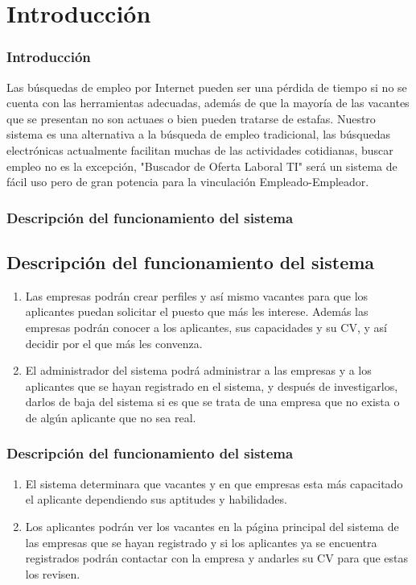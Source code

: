 \section{Introducción}
\frame
{
  \frametitle{Introducción} 
 Las búsquedas de empleo por Internet pueden ser una pérdida de tiempo si no se cuenta con las herramientas adecuadas, además de que la mayoría de las vacantes que se presentan no son actuaes o bien pueden tratarse de estafas.
\newline
Nuestro sistema es una alternativa a la búsqueda de empleo tradicional, las búsquedas electrónicas actualmente facilitan muchas de  las actividades cotidianas, buscar empleo no es la excepción,  "Buscador de Oferta Laboral TI"  será un sistema de  fácil uso pero de gran potencia para la vinculación Empleado-Empleador. 
}
\frame
{
\frametitle{Descripci\'on del funcionamiento del sistema}
	
	\subsection{Descripción del funcionamiento del sistema}

\begin{enumerate}
	\item Las empresas podrán crear perfiles y así mismo vacantes para que los aplicantes puedan solicitar el puesto que más les interese. Además las empresas podrán conocer a los aplicantes, sus capacidades y su CV, y así decidir por el que más les convenza. 
	\item El administrador del sistema podrá administrar a las empresas y a los aplicantes que se hayan registrado en el sistema, y después de investigarlos, darlos de baja del sistema si es que se trata de una empresa que no exista o de algún aplicante que no sea real. 
\end{enumerate}

}

\frame
{
\frametitle{Descripci\'on del funcionamiento del sistema}

\begin{enumerate}
	

	\item El sistema determinara que vacantes y en que empresas esta más capacitado el aplicante dependiendo sus aptitudes y habilidades.
	\item Los aplicantes podrán ver los vacantes en la página principal del sistema de las empresas que se hayan registrado y si los aplicantes ya se encuentra registrados podrán contactar con la empresa y andarles su CV para que estas los revisen. 
\end{enumerate}

}

